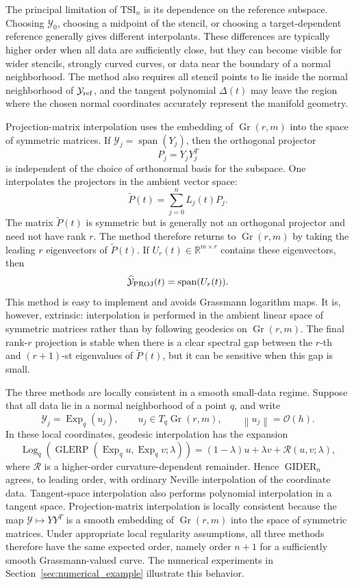\documentclass[a4paper,11pt]{article}
\newcommand{\bR}{\mathbb{R}}
\newcommand{\Log}{\operatorname{Log}}
\newcommand{\Exp}{\operatorname{Exp}}
\DeclareMathOperator{\Gr}{Gr}
\DeclareMathOperator{\spanop}{span}
\newcommand{\norm}[1]{\left\lVert #1 \right\rVert}
\newcommand{\GLERP}{\operatorname{GLERP}}
\newcommand{\GIDER}{\operatorname{GIDER}}
\numberwithin{equation}{section}
\theoremstyle{plain}
\theoremstyle{definition}
\theoremstyle{remark}
\begin{document}
The principal limitation of \(\mathrm{TSI}_n\) is its dependence on the reference subspace.  Choosing \(\mathcal{Y}_0\), choosing a midpoint of the stencil, or choosing a target-dependent reference generally gives different interpolants.  These differences are typically higher order when all data are sufficiently close, but they can become visible for wider stencils, strongly curved curves, or data near the boundary of a normal neighborhood.  The method also requires all stencil points to lie inside the normal neighborhood of \(\mathcal{Y}_{\rm ref}\), and the tangent polynomial \(\Delta(t)\) may leave the region where the chosen normal coordinates accurately represent the manifold geometry.

Projection-matrix interpolation uses the embedding of \(\Gr(r,m)\) into the space of symmetric matrices.  If \(\mathcal{Y}_j=\spanop(Y_j)\), then the orthogonal projector
\[
    P_j=Y_jY_j^T
\]
is independent of the choice of orthonormal basis for the subspace.  One interpolates the projectors in the ambient vector space:
\[
    \widetilde P(t)=\sum_{j=0}^n L_j(t)P_j.
\]
The matrix \(\widetilde P(t)\) is symmetric but is generally not an orthogonal projector and need not have rank \(r\).  The method therefore returns to \(\Gr(r,m)\) by taking the leading \(r\) eigenvectors of \(\widetilde P(t)\).  If \(U_r(t)\in\bR^{m\times r}\) contains these eigenvectors, then
\[
    \widehat{\mathcal{Y}}_{\rm PROJ}(t)=\spanop(U_r(t)).
\]
This method is easy to implement and avoids Grassmann logarithm maps.  It is, however, extrinsic: interpolation is performed in the ambient linear space of symmetric matrices rather than by following geodesics on \(\Gr(r,m)\).  The final rank-\(r\) projection is stable when there is a clear spectral gap between the \(r\)-th and \((r+1)\)-st eigenvalues of \(\widetilde P(t)\), but it can be sensitive when this gap is small.

The three methods are locally consistent in a smooth small-data regime.  Suppose that all data lie in a normal neighborhood of a point \(q\), and write
\[
    \mathcal{Y}_j=\Exp_q(u_j),
    \qquad
    u_j\in T_q\Gr(r,m),
    \qquad
    \norm{u_j}=\mathcal{O}(h).
\]
In these local coordinates, geodesic interpolation has the expansion
\[
    \Log_q\left(
        \GLERP(\Exp_q u,\Exp_q v;\lambda)
    \right)
    =
    (1-\lambda)u+\lambda v+\mathcal{R}(u,v;\lambda),
\]
where \(\mathcal{R}\) is a higher-order curvature-dependent remainder.  Hence \(\GIDER_n\) agrees, to leading order, with ordinary Neville interpolation of the coordinate data.  Tangent-space interpolation also performs polynomial interpolation in a tangent space.  Projection-matrix interpolation is locally consistent because the map \(\mathcal{Y}\mapsto YY^T\) is a smooth embedding of \(\Gr(r,m)\) into the space of symmetric matrices.  Under appropriate local regularity assumptions, all three methods therefore have the same expected order, namely order \(n+1\) for a sufficiently smooth Grassmann-valued curve.  The numerical experiments in Section~\ref{sec:numerical_example} illustrate this behavior.
\end{document}

